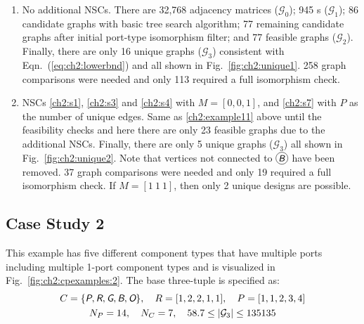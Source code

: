 \begin{enumerate}[nosep]

\item \label{ch2:example11} No additional NSCs. There are 32,768 adjacency matrices ($\mathcal{G}_0$);  945 \mypm{}s ($\mathcal{G}_1$); 86 candidate graphs with basic tree search algorithm; 77 remaining candidate graphs after initial port-type isomorphism filter; and 77 feasible graphs ($\mathcal{G}_2$). Finally, there are only 16 unique graphs ($\mathcal{G}_3$) consistent with Eqn.~(\ref{eq:ch2:lowerbnd}) and all shown in Fig.~\ref{fig:ch2:unique1}. 258 graph comparisons were needed and only 113 required a full isomorphism check.



\item \label{ch2:example12} NSCs \ref{ch2:s1}, \ref{ch2:s3} and \ref{ch2:s4} with $M=[0, 0, 1]$, and \ref{ch2:s7} with $P$ as the number of unique edges. Same as \ref{ch2:example11} above until the feasibility checks and here there are only 23 feasible graphs due to the additional NSCs. Finally, there are only 5 unique graphs ($\mathcal{G}_3$) all shown in Fig.~\ref{fig:ch2:unique2}. Note that vertices not connected to $\circled{\xcolor{B}}$ have been removed. 37 graph comparisons were needed and only 19 required a full isomorphism check. If  $M=[1\ 1\ 1]$, then only 2 unique designs are possible.



\end{enumerate} 

\subsection{Case Study 2\label{sec:ch2:example2}}

This example has five different component types that have multiple ports including multiple 1-port component types and is visualized in Fig.~\ref{fig:ch2:cpexamples:2}. The base three-tuple is specified as:
\begin{gather*}
{C} = \{ \xcolor{P}, \xcolor{R}, \xcolor{G}, \xcolor{B}, \xcolor{O} \}, \quad {R} = [ 1, 2, 2, 1, 1 ], \quad {P} = [ 1, 1, 2, 3, 4 ] \\
N_P = 14, \quad N_C = 7, \quad 58.7 \leq \abs*{\mathcal{G}_3} \leq 135135
\end{gather*}

